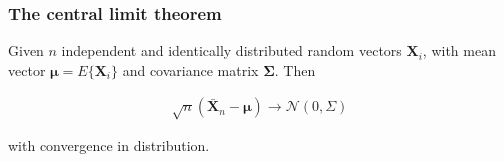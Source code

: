 \documentclass{beamer}
\begin{document}
\begin{frame}
    \frametitle{The central limit theorem \citep{papoulisAndPillai02}}

	\begin{theorem}
		Given $n$ independent and identically distributed random vectors $\mathbf{X}_i$, with mean vector $\boldsymbol{\mu}=E\{\mathbf{X}_i\}$ and covariance matrix $\mathbf{\Sigma}$. Then

		\begin{align*}
			\sqrt{n}(\bar{\mathbf{X}}_n-\boldsymbol{\mu})\rightarrow\mathcal{N}(0,\Sigma)
		\end{align*}

		with convergence in distribution.
	\end{theorem}
\end{frame}
\end{document}
